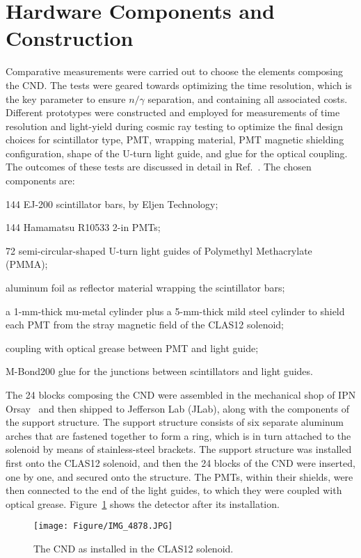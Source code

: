 \section{Hardware Components and Construction}

Comparative measurements were carried out to choose the elements composing the CND. The tests were geared towards optimizing the time resolution, which is the key parameter to ensure $n/\gamma$ separation, and containing all associated costs. 
Different prototypes were constructed and employed for measurements of time resolution and light-yield during cosmic ray testing to optimize the final design choices for scintillator type, PMT, wrapping material, PMT magnetic shielding configuration, shape of the U-turn light guide, and glue for the optical coupling. The outcomes of these tests are discussed in detail
in Ref.~\cite{Niccolai:2018qzm}.
The chosen components are:
\begin{itemize}
\item{144 EJ-200 scintillator bars, by Eljen Technology;}
\item{144 Hamamatsu R10533 2-in PMTs;}
\item{72 semi-circular-shaped U-turn light guides of Polymethyl Methacrylate (PMMA);
\item{aluminum foil as reflector material wrapping the scintillator bars;}
}
\item{a 1-mm-thick mu-metal cylinder plus a 5-mm-thick mild steel cylinder to shield each PMT from the stray magnetic field of the CLAS12 solenoid;}
\item{coupling with optical grease between PMT and light guide;}
\item{M-Bond200 glue for the junctions between scintillators and light guides.}
\end{itemize}

The 24 blocks composing the CND were assembled in the mechanical shop of IPN Orsay~\cite{Niccolai:2018qzm} and then shipped to Jefferson Lab (JLab), along with the components of the support structure. The support structure consists of six separate aluminum arches that are fastened together to form a ring, which is in turn attached to the solenoid by means of stainless-steel brackets. 
The support structure was installed first onto the CLAS12 solenoid, and then the 24 blocks of the CND were inserted, one by one, and secured onto the structure. The PMTs, within their shields, were then connected to the end of the light guides, to which they were coupled with optical grease. Figure~\ref{photo_cnd_installed} shows the detector after its installation. 
\begin{figure}[htb]
\begin{center}
\texttt{[image: Figure/IMG\_4878.JPG]} 
\end{center}
\caption{The CND as installed in the CLAS12 solenoid.}
\label{photo_cnd_installed}
\end{figure}
